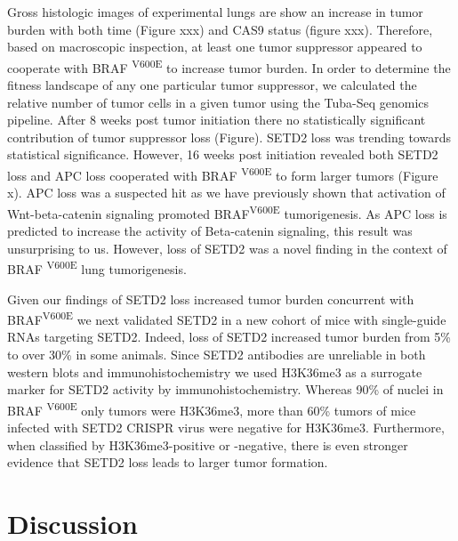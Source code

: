 Gross histologic images of experimental lungs are show an increase in tumor burden with both time (Figure xxx) and CAS9 status (figure xxx).
Therefore, based on macroscopic inspection, at least one tumor suppressor appeared to cooperate with BRAF \textsuperscript{V600E} to increase tumor burden.
In order to determine the fitness landscape of any one particular tumor suppressor, we calculated the relative number of tumor cells in a given tumor using the Tuba-Seq genomics pipeline.
After 8 weeks post tumor initiation there no statistically significant contribution of tumor suppressor loss (Figure).
SETD2 loss was trending towards statistical significance.
However, 16 weeks post initiation revealed both SETD2 loss and APC loss cooperated with BRAF \textsuperscript{V600E} to form larger tumors (Figure x).
APC loss was a suspected hit as we have previously shown that activation of Wnt-beta-catenin signaling promoted BRAF\textsuperscript{V600E} tumorigenesis.
As APC loss is predicted to increase the activity of Beta-catenin signaling, this result was unsurprising to us.
However, loss of SETD2 was a novel finding in the context of BRAF \textsuperscript{V600E} lung tumorigenesis.

Given our findings of SETD2 loss increased tumor burden concurrent with BRAF\textsuperscript{V600E} we next validated SETD2 in a new cohort of mice with single-guide RNAs targeting SETD2.
Indeed, loss of SETD2 increased tumor burden from 5\% to over 30\% in some animals.
Since SETD2 antibodies are unreliable in both western blots and immunohistochemistry we used H3K36me3 as a surrogate marker for SETD2 activity by immunohistochemistry.
Whereas 90\% of nuclei in BRAF \textsuperscript{V600E} only tumors were H3K36me3, more than 60\% tumors of mice infected with SETD2 CRISPR virus were negative for H3K36me3.
Furthermore, when classified by H3K36me3-positive or -negative, there is even stronger evidence that SETD2 loss leads to larger tumor formation.

\hypertarget{discussion}{%
\section{Discussion}\label{discussion}}

